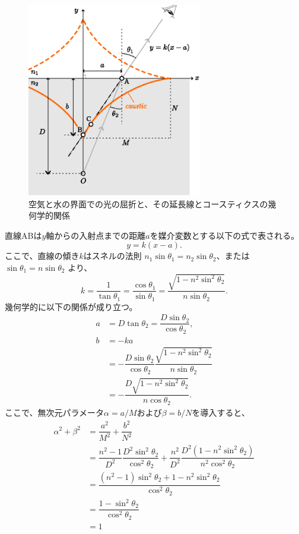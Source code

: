 \documentclass[twocolumn]{article}
\begin{document}
\begin{figure}
	\centering
	\includegraphics[width=3in]{figs/g237.eps}
	\caption{空気と水の界面での光の屈折と、その延長線とコースティクスの幾何学的関係}
	\label{fig:geometry}
\end{figure}
	
直線ABは$y$軸からの入射点までの距離$a$を媒介変数とする以下の式で表される。
$$y=k(x-a).$$
ここで、直線の傾き$k$はスネルの法則
$ {n_1} \sin\theta_1 = {n_2} \sin\theta_2$、または$\sin\theta_1 = n\sin\theta_2$
より、
$$k=\dfrac{1}{\tan\theta_1}=\dfrac{\cos\theta_1}{\sin\theta_1}
=\dfrac{\sqrt{1-n^2\sin^2\theta_2}}{n\sin\theta_2}.$$
幾何学的に以下の関係が成り立つ。
$$\begin{aligned}
	a &= D\tan\theta_2 = \dfrac{D\sin\theta_2}{\cos\theta_2},\\
	b &= -ka \\
	&= -\dfrac{D\sin\theta_2}{\cos\theta_2}
	\dfrac{\sqrt{1-n^2\sin^2\theta_2}}{n\sin\theta_2}\\
	&=-\dfrac{D\sqrt{1-n^2\sin^2\theta_2}}{n\cos\theta_2}.
\end{aligned}$$
ここで、無次元パラメータ$\alpha=a/M$および$\beta=b/N$を導入すると、
$$ \begin{aligned}
	\alpha^2 + \beta^2 &= \dfrac{a^2}{M^2}+\dfrac{b^2}{N^2}\\
	&=\dfrac{n^2-1}{D^2}\dfrac{D^2\sin^2\theta_2}{\cos^2\theta_2}%
	+\dfrac{n^2}{D^2}\dfrac{D^2(1-n^2\sin^2\theta_2)}{n^2\cos^2\theta_2}\\
	&=\dfrac{\left(n^2-1\right)\sin^2\theta_2 + 1-n^2\sin^2\theta_2}
	{\cos^2\theta_2}\\
	&=\dfrac{1-\sin^2\theta_2}{\cos^2\theta_2}\\
	&= 1
\end{aligned}$$
	
\end{document}
